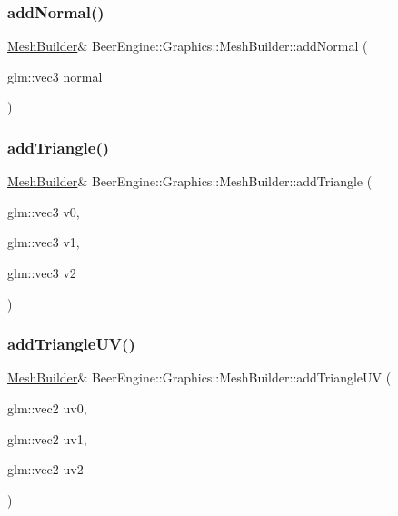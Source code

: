 \subsubsection{\texorpdfstring{add\+Normal()}{addNormal()}}
{\footnotesize\ttfamily \mbox{\hyperlink{class_beer_engine_1_1_graphics_1_1_mesh_builder}{Mesh\+Builder}}\& Beer\+Engine\+::\+Graphics\+::\+Mesh\+Builder\+::add\+Normal (\begin{DoxyParamCaption}\item[{glm\+::vec3}]{normal }\end{DoxyParamCaption})}

\mbox{\label{class_beer_engine_1_1_graphics_1_1_mesh_builder_ad652a03729f4938ce4d198edf4ab6abe}} 
\subsubsection{\texorpdfstring{add\+Triangle()}{addTriangle()}}
{\footnotesize\ttfamily \mbox{\hyperlink{class_beer_engine_1_1_graphics_1_1_mesh_builder}{Mesh\+Builder}}\& Beer\+Engine\+::\+Graphics\+::\+Mesh\+Builder\+::add\+Triangle (\begin{DoxyParamCaption}\item[{glm\+::vec3}]{v0,  }\item[{glm\+::vec3}]{v1,  }\item[{glm\+::vec3}]{v2 }\end{DoxyParamCaption})}

\mbox{\label{class_beer_engine_1_1_graphics_1_1_mesh_builder_a99f5b7d008ee3a621835db8b2c5ef5c8}} 
\subsubsection{\texorpdfstring{add\+Triangle\+U\+V()}{addTriangleUV()}}
{\footnotesize\ttfamily \mbox{\hyperlink{class_beer_engine_1_1_graphics_1_1_mesh_builder}{Mesh\+Builder}}\& Beer\+Engine\+::\+Graphics\+::\+Mesh\+Builder\+::add\+Triangle\+UV (\begin{DoxyParamCaption}\item[{glm\+::vec2}]{uv0,  }\item[{glm\+::vec2}]{uv1,  }\item[{glm\+::vec2}]{uv2 }\end{DoxyParamCaption})}

